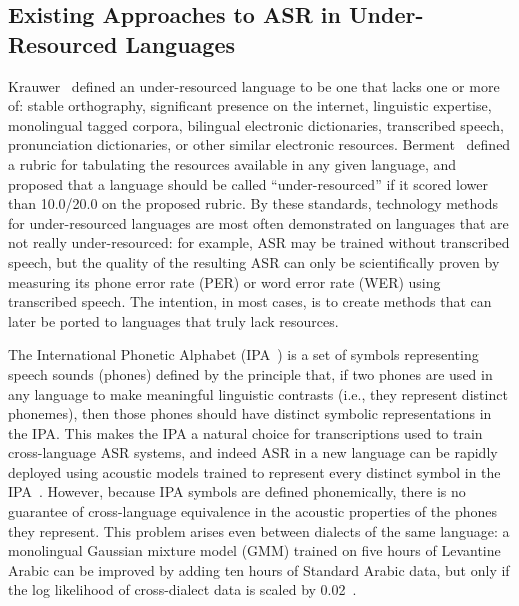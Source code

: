 \subsection{Existing Approaches to ASR in Under-Resourced Languages}

Krauwer~\cite{Krauwer2003} defined an under-resourced language to be
one that lacks one or more of: stable orthography, significant
presence on the internet, linguistic expertise, monolingual tagged
corpora, bilingual electronic dictionaries, transcribed speech,
pronunciation dictionaries, or other similar electronic resources.
Berment~\cite{Berment2004} defined a rubric for tabulating the
resources available in any given language, and proposed that a
language should be called ``under-resourced'' if it scored lower than
10.0/20.0 on the proposed rubric.  By these standards, technology
methods for under-resourced languages are most often demonstrated on
languages that are not really under-resourced: for example, ASR may be
trained without transcribed speech, but the quality of the resulting
ASR can only be scientifically proven by measuring its phone error
rate (PER) or word error rate (WER) using transcribed speech.  The
intention, in most cases, is to create methods that can later be
ported to languages that truly lack resources.

The International Phonetic Alphabet (IPA~\cite{ipa1993}) is a set of
symbols representing speech sounds (phones) defined by the principle
that, if two phones are used in any language to make meaningful
linguistic contrasts (i.e., they represent distinct phonemes), then
those phones should have distinct symbolic representations in the IPA.
This makes the IPA a natural choice for transcriptions used to train
cross-language ASR systems, and indeed ASR in a new language can be 
rapidly deployed using acoustic models trained to represent every 
distinct symbol in the IPA~\cite{Schultz2001}.
However, because IPA symbols are defined phonemically, there is no
guarantee of cross-language equivalence in the acoustic properties of
the phones they represent. This problem arises even between dialects of
the same language: a monolingual Gaussian mixture model (GMM) trained on
five hours of Levantine Arabic can be improved by adding ten hours of
Standard Arabic data, but only if the log likelihood of cross-dialect
data is scaled by 0.02~\cite{Huang2012}.


